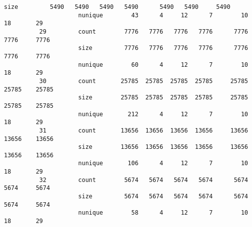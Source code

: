 \documentclass[11pt]{article}
\begin{document}
\begin{Verbatim}[commandchars=\\\{\}]
                     size         5490   5490   5490   5490      5490   5490     5490   
                     nunique        43      4     12      7        10     18       29   
          29         count        7776   7776   7776   7776      7776   7776     7776   
                     size         7776   7776   7776   7776      7776   7776     7776   
                     nunique        60      4     12      7        10     18       29   
          30         count       25785  25785  25785  25785     25785  25785    25785   
                     size        25785  25785  25785  25785     25785  25785    25785   
                     nunique       212      4     12      7        10     18       29   
          31         count       13656  13656  13656  13656     13656  13656    13656   
                     size        13656  13656  13656  13656     13656  13656    13656   
                     nunique       106      4     12      7        10     18       29   
          32         count        5674   5674   5674   5674      5674   5674     5674   
                     size         5674   5674   5674   5674      5674   5674     5674   
                     nunique        58      4     12      7        10     18       29   
          

\end{Verbatim}
\end{document}
